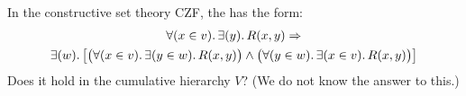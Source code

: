 \begin{ex}
   In the constructive set theory CZF, the  has the form:
   \begin{multline*}
   \fall{x\in v}\exis{y} R(x,y) \Rightarrow \\
   \exis{w}\big[\big(\fall{x\in v}\exis{y\in w}R(x,y)\big)\land \big(\fall{y\in w}\exis{x\in v}R(x,y) \big)\big]
   \end{multline*}
   Does it hold in the cumulative hierarchy $V$?  (We do not know the answer to this.)
\end{ex}

